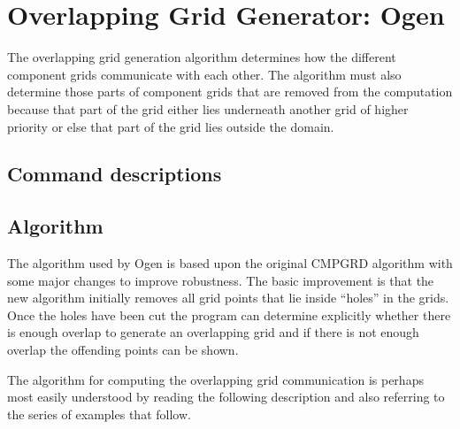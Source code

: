 

\section{Overlapping Grid Generator: Ogen}


The overlapping grid generation algorithm determines how the different
component grids communicate with each other. The algorithm must also
determine those parts of component grids that are removed from the
computation because that part of the grid either lies underneath 
another grid of higher priority or else that part of the grid lies
outside the domain.

\subsection{Command descriptions} \label{sec:ogen:commands}





\subsection{Algorithm} \label{algorithm}

  The algorithm used by Ogen is based upon the original CMPGRD algorithm\cite{CGNS}
with some major changes to improve robustness. The basic improvement is that the new
algorithm initially removes all grid points that lie inside ``holes'' in the grids.
Once the holes have been cut the program can determine explicitly whether there is
enough overlap to generate an overlapping grid and if there is not enough overlap
the offending points can be shown.  


The algorithm for computing the overlapping grid communication is perhaps most
easily understood by reading the following description and also referring to
the series of examples that follow. 

